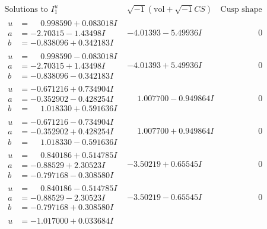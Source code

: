 \documentclass[1p]{elsarticle_modified}
\theoremstyle{definition}
\newcommand{\I}{\sqrt{-1}}
\begin{document}
$$\begin{array}{c|c|c}  
\text{Solutions to }I^u_{1}& \I (\text{vol} + \sqrt{-1}CS) & \text{Cusp shape}\\
 \hline 
\begin{aligned}
u &= \phantom{-}0.998590 + 0.083018 I \\
a &= -2.70315 - 1.43498 I \\
b &= -0.838096 + 0.342183 I\end{aligned}
 & -4.01393 - 5.49936 I & \phantom{-0.000000 } 0 \\ \hline\begin{aligned}
u &= \phantom{-}0.998590 - 0.083018 I \\
a &= -2.70315 + 1.43498 I \\
b &= -0.838096 - 0.342183 I\end{aligned}
 & -4.01393 + 5.49936 I & \phantom{-0.000000 } 0 \\ \hline\begin{aligned}
u &= -0.671216 + 0.734904 I \\
a &= -0.352902 - 0.428254 I \\
b &= \phantom{-}1.018330 + 0.591636 I\end{aligned}
 & \phantom{-}1.007700 - 0.949864 I & \phantom{-0.000000 } 0 \\ \hline\begin{aligned}
u &= -0.671216 - 0.734904 I \\
a &= -0.352902 + 0.428254 I \\
b &= \phantom{-}1.018330 - 0.591636 I\end{aligned}
 & \phantom{-}1.007700 + 0.949864 I & \phantom{-0.000000 } 0 \\ \hline\begin{aligned}
u &= \phantom{-}0.840186 + 0.514785 I \\
a &= -0.88529 + 2.30523 I \\
b &= -0.797168 - 0.308580 I\end{aligned}
 & -3.50219 + 0.65545 I & \phantom{-0.000000 } 0 \\ \hline\begin{aligned}
u &= \phantom{-}0.840186 - 0.514785 I \\
a &= -0.88529 - 2.30523 I \\
b &= -0.797168 + 0.308580 I\end{aligned}
 & -3.50219 - 0.65545 I & \phantom{-0.000000 } 0 \\ \hline\begin{aligned}
u &= -1.017000 + 0.033684 I \\

\end{aligned}
\end{array}$$
\end{document}
